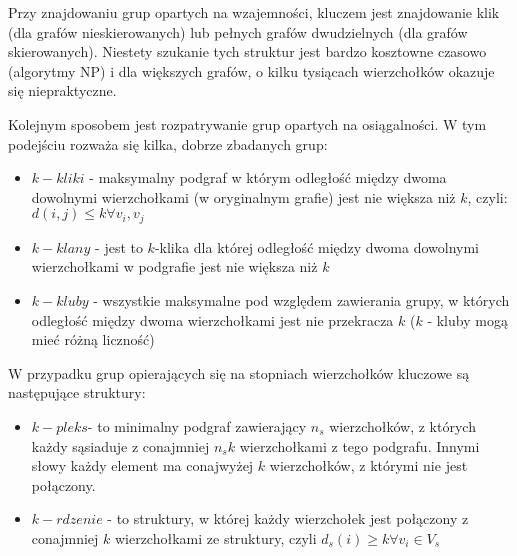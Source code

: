 \documentclass{article}
\begin{document}
Przy znajdowaniu grup opartych na  wzajemności, kluczem jest znajdowanie klik (dla grafów nieskierowanych) lub pełnych grafów dwudzielnych (dla grafów skierowanych). Niestety szukanie tych struktur jest bardzo kosztowne czasowo (algorytmy NP) i dla większych grafów, o kilku tysiącach wierzchołków okazuje się niepraktyczne.

Kolejnym sposobem jest rozpatrywanie grup opartych na osiągalności. W tym podejściu rozważa się kilka, dobrze zbadanych grup:

\begin{itemize}
\item $k-kliki$ - maksymalny podgraf w którym odległość między dwoma dowolnymi wierzchołkami (w oryginalnym grafie) jest nie większa niż $k$, czyli: $d(i,j)\leq k \forall v_i , v_j $
\item  $k-klany$ - jest to $k$-klika dla której odległość między dwoma dowolnymi wierzchołkami w podgrafie jest nie większa niż $k$
\item $k - kluby$ - wszystkie maksymalne pod względem zawierania grupy, w których odległość między dwoma wierzchołkami jest nie przekracza $k$ ($k$ - kluby mogą mieć różną liczność)
\end{itemize}

W przypadku grup opierających się na stopniach wierzchołków kluczowe są następujące struktury:

\begin{itemize}
\item $k - pleks $- to minimalny podgraf zawierający $n_s$ wierzchołków, z których każdy sąsiaduje z conajmniej $n_s k$ wierzchołkami z tego podgrafu. Innymi słowy każdy element ma conajwyżej $k$ wierzchołków, z którymi nie jest połączony.
\item $k - rdzenie$ -  to struktury, w której każdy wierzchołek jest połączony z conajmniej $k$ wierzchołkami ze struktury, czyli  $d_s(i)\geq k \forall v_i \in V_s $
\end{itemize}
\end{document}
